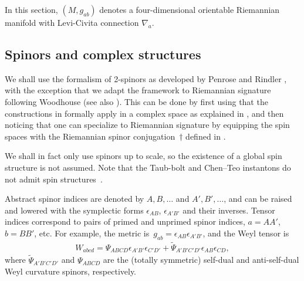 \documentclass[10pt,a4paper]{amsart}
\numberwithin{equation}{section}
\begin{document}
In this section, $(M,g_{ab})$ denotes a four-dimensional orientable Riemannian manifold with Levi-Civita connection $\nabla_{a}$.

\subsection{Spinors and complex structures} \label{sec:spinors}
We shall use the formalism of 2-spinors as developed by Penrose and Rindler \cite{PR:I, PR:II}, with the exception that we adapt the framework to Riemannian signature following Woodhouse \cite{Woodhouse_1985} (see also \cite{1994GReGr..26..979G}).
This can be done by first using that the constructions in \cite{PR:I, PR:II} formally apply in a complex space as explained in \cite[Section 6.9]{PR:II}, and then noticing that one can specialize to Riemannian signature by equipping the spin spaces with the Riemannian spinor conjugation~$\dagger$ defined in \cite[equation~(2.5)]{Woodhouse_1985}.

We shall in fact only use spinors up to scale, so the existence of a global spin structure is not assumed. Note that the Taub-bolt and Chen--Teo instantons do not admit spin structures~\mbox{\cite{2011PhLB..703..359C, 1978PhLB...78..249P}}.

Abstract spinor indices are denoted by $A,B,\dots $ and $A',B',\dots $, and can be raised and lowered with the symplectic forms $\epsilon_{AB}$, $\epsilon_{A'B'}$ and their inverses. Tensor indices correspond to pairs of primed and unprimed spinor indices, $a=AA'$, $b=BB'$, etc. For example, the metric is~${g_{ab}=\epsilon_{AB}\epsilon_{A'B'}}$, and the Weyl tensor is
\begin{align*}%
 W_{abcd} = \Psi_{ABCD}\epsilon_{A'B'}\epsilon_{C'D'} + \tilde\Psi_{A'B'C'D'}\epsilon_{AB}\epsilon_{CD},
\end{align*}
where $\tilde\Psi_{A'B'C'D'}$ and $\Psi_{ABCD}$ are the (totally symmetric) self-dual and anti-self-dual Weyl curvature spinors, respectively.
\end{document}

